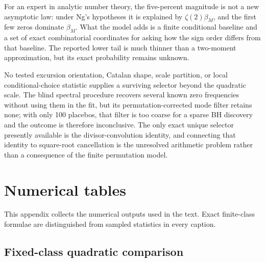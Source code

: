 \documentclass[11pt,reqno]{amsart}
\numberwithin{equation}{section}
\theoremstyle{plain}
\theoremstyle{definition}
\theoremstyle{remark}
\begin{document}
For an expert in analytic number theory, the five-percent magnitude is not a
new asymptotic law: under Ng's hypotheses it is explained by
\(\zeta(2)\beta_M\), and the first few zeros dominate \(\beta_M\).  What the
model adds is a finite conditional baseline and a set of exact combinatorial
coordinates for asking how the sign order differs from that baseline.  The
reported lower tail is much thinner than a two-moment approximation, but its
exact probability remains unknown.

No tested excursion orientation, Catalan shape, scale partition, or local
conditional-choice statistic supplies a surviving selector beyond the
quadratic scale.  The blind spectral procedure recovers several known zero
frequencies without using them in the fit, but its permutation-corrected
mode filter retains none; with only 100 placebos, that filter is too coarse
for a sparse BH discovery and the outcome is therefore inconclusive.  The
only exact unique selector presently available
is the divisor-convolution identity, and connecting that identity to
square-root cancellation is the unresolved arithmetic problem rather than a
consequence of the finite permutation model.

\appendix

\section{Numerical tables}
\label{app:numerical-results}

This appendix collects the numerical outputs used in the text.  Exact
finite-class formulae are distinguished from sampled statistics in every
caption.

\subsection{Fixed-class quadratic comparison}
\label{subsec:numerical-fixed-class}
\end{document}
